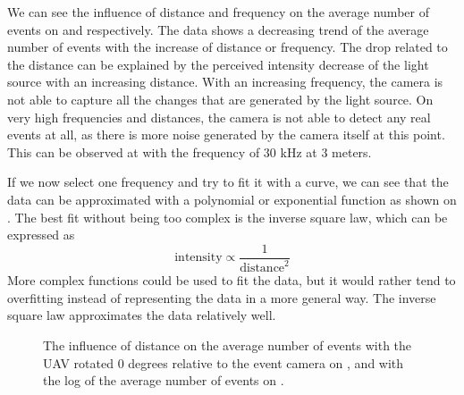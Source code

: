 We can see the influence of distance and frequency on the average number of events on
 and  respectively. The data shows a decreasing trend of the average number of events
with the increase of distance or frequency. The drop related to the distance can be explained by the perceived intensity
decrease of the light source with an increasing distance. With an increasing frequency, the camera is not able to capture
all the changes that are generated by the light source. On very high frequencies and distances, the camera is not able
to detect any real events at all, as there is more noise generated by the camera itself at this point. This can be observed
at  with the frequency of $30$ kHz at $3$ meters.

If we now select one frequency and try to fit it with a curve,
we can see that the data can be approximated with a polynomial or exponential function as shown on .
The best fit without being too complex is the inverse square law, which can be expressed as
\begin{equation}
	\text{intensity} \propto \frac{1}{\text{distance}^2}
\end{equation}
More complex functions could be used to fit the data, but it would rather tend to overfitting instead
of representing the data in a more general way. The inverse square law approximates the data relatively well.

\begin{figure}[H]
	\centering
	\caption{
  The influence of distance on the average number of events with the UAV rotated 0 degrees relative to the event camera on , and with the log of the average number of events on .
  }
	\label{fig:dist}
\end{figure}

